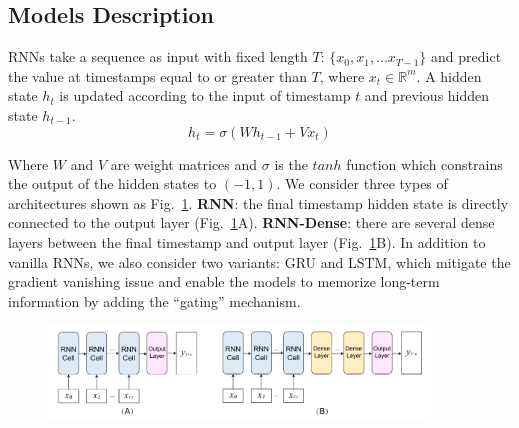 \subsection{Models Description}
\label{section:model_description}
RNNs take a sequence as input with fixed length $T$: $\{x_0, x_1,... x_{T-1}\}$ and predict the value at timestamps equal to or greater than $T$, where $x_{t} \in \mathbb R^{m}$. 
A hidden state $h_t$ is updated according to the input of timestamp $t$ and previous hidden state $h_{t-1}$.
\begin{equation} 
h_t = \sigma(Wh_{t-1} + Vx_t)
\end{equation}

Where $W$ and $V$ are weight matrices and $\sigma$ is the $tanh$ function which constrains the output of the hidden states to $(-1, 1)$. We consider three types of architectures shown as Fig.~\ref{fig:model_type}. 
\textbf{RNN}: the final timestamp hidden state is directly connected to the output layer (Fig.~\ref{fig:model_type}A). \textbf{RNN-Dense}: there are several dense layers between the final timestamp and output layer (Fig.~\ref{fig:model_type}B). 
In addition to vanilla RNNs, we also consider two variants: GRU and LSTM, which mitigate the gradient vanishing issue and enable the models to memorize long-term information by adding the ``gating'' mechanism.


\begin{figure}[t]
	\centering
    \includegraphics[width=0.9\textwidth]{figure/MultiRNNExplorer/model_description/model.pdf}
	\vspace{-5mm}
	\caption{
	}
	\label{fig:model_type}
\end{figure}

